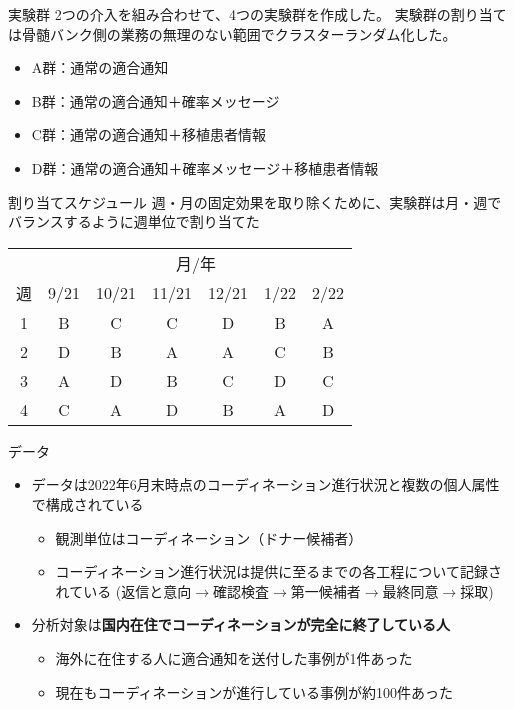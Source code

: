\documentclass[
      aspectratio=169,
        12pt,
    ]{beamer}
\renewcommand{\textbf}[1]{{\color{DarkBlue}\bfseries#1}}
\providecommand{\tightlist}{%
  \setlength{\itemsep}{0pt}\setlength{\parskip}{0pt}}
\begin{document}
\begin{frame}{実験群}
\protect\hypertarget{ux5b9fux9a13ux7fa4}{}
2つの介入を組み合わせて、4つの実験群を作成した。
実験群の割り当ては骨髄バンク側の業務の無理のない範囲でクラスターランダム化した。

\begin{itemize}
\tightlist
\item
  A群：通常の適合通知
\item
  B群：通常の適合通知＋確率メッセージ
\item
  C群：通常の適合通知＋移植患者情報
\item
  D群：通常の適合通知＋確率メッセージ＋移植患者情報
\end{itemize}
\end{frame}

\begin{frame}{割り当てスケジュール}
\protect\hypertarget{ux5272ux308aux5f53ux3066ux30b9ux30b1ux30b8ux30e5ux30fcux30eb}{}
週・月の固定効果を取り除くために、実験群は月・週でバランスするように週単位で割り当てた

\begin{table}
\centering
\begin{tabular}[t]{ccccccc}
\toprule
\multicolumn{1}{c}{ } & \multicolumn{6}{c}{月/年} \\
\cmidrule(l{3pt}r{3pt}){2-7}
週 & 9/21 & 10/21 & 11/21 & 12/21 & 1/22 & 2/22\\
\midrule
1 & B & C & C & D & B & A\\
2 & D & B & A & A & C & B\\
3 & A & D & B & C & D & C\\
4 & C & A & D & B & A & D\\
\bottomrule
\end{tabular}
\end{table}
\end{frame}

\begin{frame}{データ}
\protect\hypertarget{ux30c7ux30fcux30bf}{}
\begin{itemize}
\tightlist
\item
  データは2022年6月末時点のコーディネーション進行状況と複数の個人属性で構成されている

  \begin{itemize}
  \tightlist
  \item
    観測単位はコーディネーション（ドナー候補者）
  \item
    コーディネーション進行状況は提供に至るまでの各工程について記録されている
    (返信と意向\(\to\)確認検査\(\to\)第一候補者\(\to\)最終同意\(\to\)採取)
  \end{itemize}
\item
  分析対象は\textbf{国内在住でコーディネーションが完全に終了している人}

  \begin{itemize}
  \tightlist
  \item
    海外に在住する人に適合通知を送付した事例が1件あった
  \item
    現在もコーディネーションが進行している事例が約100件あった
  \end{itemize}
\end{itemize}
\end{frame}
\end{document}
